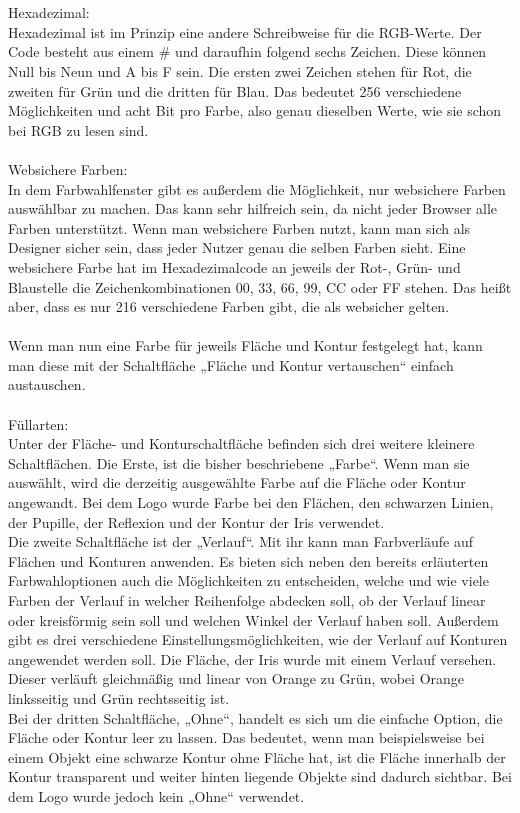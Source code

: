 \leavevmode \\
\leavevmode \\
Hexadezimal:
\leavevmode \\
Hexadezimal ist im Prinzip eine andere Schreibweise für die RGB-Werte. Der Code besteht aus einem \# und daraufhin folgend sechs Zeichen. Diese können Null bis Neun und A bis F sein. Die ersten zwei Zeichen stehen für Rot, die zweiten für Grün und die dritten für Blau. Das bedeutet 256 verschiedene Möglichkeiten und acht Bit pro Farbe, also genau dieselben Werte, wie sie schon bei RGB zu lesen sind.\cite{hex}
\leavevmode \\
\leavevmode \\
Websichere Farben:
\leavevmode \\
In dem Farbwahlfenster gibt es außerdem die Möglichkeit, nur websichere Farben auswählbar zu machen. Das kann sehr hilfreich sein, da nicht jeder Browser alle Farben unterstützt. Wenn man websichere Farben nutzt, kann man sich als Designer sicher sein, dass jeder Nutzer genau die selben Farben sieht. Eine websichere Farbe hat im Hexadezimalcode an jeweils der Rot-, Grün- und Blaustelle die Zeichenkombinationen 00, 33, 66, 99, CC oder FF stehen. Das heißt aber, dass es nur 216 verschiedene Farben gibt, die als websicher gelten.\cite{websicher}
\leavevmode \\
\leavevmode \\
Wenn man nun eine Farbe für jeweils Fläche und Kontur festgelegt hat, kann man diese mit der Schaltfläche „Fläche und Kontur vertauschen“ einfach austauschen.
\leavevmode \\
\leavevmode \\
Füllarten:
\leavevmode \\
Unter der Fläche- und Konturschaltfläche befinden sich drei weitere kleinere Schaltflächen. Die Erste, ist die bisher beschriebene „Farbe“. Wenn man sie auswählt, wird die derzeitig ausgewählte Farbe auf die Fläche oder Kontur angewandt. Bei dem Logo wurde Farbe bei den Flächen, den schwarzen Linien, der Pupille, der Reflexion und der Kontur der Iris verwendet.\cite{flakonfarbe}
\leavevmode \\
Die zweite Schaltfläche ist der „Verlauf“. Mit ihr kann man Farbverläufe auf Flächen und Konturen anwenden. Es bieten sich neben den bereits erläuterten Farbwahloptionen auch die Möglichkeiten zu entscheiden, welche und wie viele Farben der Verlauf in welcher Reihenfolge abdecken soll, ob der Verlauf linear oder kreisförmig sein soll und welchen Winkel der Verlauf haben soll. Außerdem gibt es drei verschiedene Einstellungsmöglichkeiten, wie der Verlauf auf Konturen angewendet werden soll. Die Fläche, der Iris wurde mit einem Verlauf versehen. Dieser verläuft gleichmäßig und linear von Orange zu Grün, wobei Orange linksseitig und Grün rechtsseitig ist.\cite{verlauf}
\leavevmode \\
Bei der dritten Schaltfläche, „Ohne“, handelt es sich um die einfache Option, die Fläche oder Kontur leer zu lassen. Das bedeutet, wenn man beispielsweise bei einem Objekt eine schwarze Kontur ohne Fläche hat, ist die Fläche innerhalb der Kontur transparent und weiter hinten liegende Objekte sind dadurch sichtbar. Bei dem Logo wurde jedoch kein „Ohne“ verwendet.\cite{ohne}

